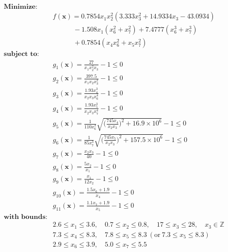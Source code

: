 \begin{align*}
\textbf{Minimize:} & \\
& f(\bm{x}) = 0.7854x_1x_2^2(3.333x_3^2 + 14.9334x_3 - 43.0934) \\
& \quad \qquad - 1.508x_1(x_6^2 + x_7^2) + 7.4777(x_6^3 + x_7^3) \\
& \quad \qquad + 0.7854(x_4 x_6^2 + x_5x_7^2) \\[0.5em]
\textbf{subject to:} &\\
& g_1(\bm{x}) = \frac{27}{x_1x_2^2x_3} - 1 \leq 0 \\
& g_2(\bm{x}) = \frac{397.5}{x_1x_2x_3^2} - 1 \leq 0 \\
& g_3(\bm{x}) = \frac{1.93x_4^3}{x_2x_3x_6^4} -1 \leq 0 \\
& g_4(\bm{x}) = \frac{1.93x_5^3}{x_2x_3x_7^4} -1 \leq 0 \\
& g_5(\bm{x}) = \frac{1}{110x_6^3} \sqrt{\Big( \frac{745x_4}{x_2x_3} \Big)^2 + 16.9 \times 10^6} - 1 \leq 0 \\
& g_6(\bm{x}) = \frac{1}{85x_7^3} \sqrt{\Big( \frac{745x_5}{x_2x_3} \Big)^2 + 157.5 \times 10^6} - 1 \leq 0 \\
& g_7(\bm{x}) = \frac{x_2x_3}{40} - 1 \leq 0 \\
& g_8(\bm{x}) = \frac{5x_2}{x_1} - 1 \leq 0 \\
& g_9(\bm{x}) = \frac{x_1}{12x_2} - 1 \leq 0 \\
& g_{10}(\bm{x}) = \frac{1.5x_6 + 1.9}{x_4} - 1 \leq 0 \\
& g_{11}(\bm{x}) = \frac{1.1x_7 + 1.9}{x_5} - 1 \leq 0 \\[0.5em]
\textbf{with bounds:} & \\
& 2.6 \leq x_1 \leq 3.6, \quad 0.7 \leq x_2 \leq 0.8, \quad 17 \leq x_3 \leq 28, \quad x_3 \in \mathbb{Z} \\
& 7.3 \leq x_4 \leq 8.3, \quad 7.8 \leq x_5 \leq 8.3 \ (\text{or} \ 7.3 \leq x_5 \leq 8.3) \\
& 2.9 \leq x_6 \leq 3.9, \quad 5.0 \leq x_7 \leq 5.5
\end{align*}